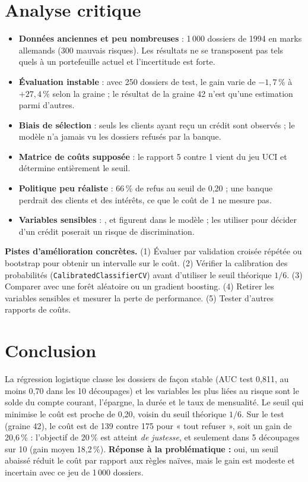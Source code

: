 \documentclass[10.5pt,a4paper]{article}
\newcommand{\var}[1]{\texttt{\detokenize{#1}}}
\newcommand{\pc}{\,\%}
\begin{document}
\section{Analyse critique}
\begin{itemize}
\item \textbf{Données anciennes et peu nombreuses} : 1\,000 dossiers de 1994 en marks allemands (300 mauvais risques). Les résultats ne se transposent pas tels quels à un portefeuille actuel et l'incertitude est forte.
\item \textbf{Évaluation instable} : avec 250 dossiers de test, le gain varie de $-1{,}7\pc{}$ à $+27{,}4\pc{}$ selon la graine ; le résultat de la graine 42 n'est qu'une estimation parmi d'autres.
\item \textbf{Biais de sélection} : seuls les clients ayant reçu un crédit sont observés ; le modèle n'a jamais vu les dossiers refusés par la banque.
\item \textbf{Matrice de coûts supposée} : le rapport 5 contre 1 vient du jeu UCI et détermine entièrement le seuil.
\item \textbf{Politique peu réaliste} : 66\pc{} de refus au seuil de 0,20 ; une banque perdrait des clients et des intérêts, ce que le coût de 1 ne mesure pas.
\item \textbf{Variables sensibles} : \var{age}, \var{statut_personnel} et \var{travailleur_etranger} figurent dans le modèle ; les utiliser pour décider d'un crédit poserait un risque de discrimination.
\end{itemize}
\textbf{Pistes d'amélioration concrètes.} (1) Évaluer par validation croisée répétée ou bootstrap pour obtenir un intervalle sur le coût. (2) Vérifier la calibration des probabilités (\texttt{CalibratedClassifierCV}) avant d'utiliser le seuil théorique $1/6$. (3) Comparer avec une forêt aléatoire ou un gradient boosting. (4) Retirer les variables sensibles et mesurer la perte de performance. (5) Tester d'autres rapports de coûts.

\section{Conclusion}
\begin{encadre}
La régression logistique classe les dossiers de façon stable (AUC test 0,811, au moins 0,70 dans les 10 découpages) et les variables les plus liées au risque sont le solde du compte courant, l'épargne, la durée et le taux de mensualité. Le seuil qui minimise le coût est proche de 0,20, voisin du seuil théorique $1/6$. Sur le test (graine 42), le coût est de 139 contre 175 pour « tout refuser », soit un gain de 20,6\pc{} : l'objectif de 20\pc{} est atteint \emph{de justesse}, et seulement dans 5 découpages sur 10 (gain moyen 18,2\pc). \textbf{Réponse à la problématique :} oui, un seuil abaissé réduit le coût par rapport aux règles naïves, mais le gain est modeste et incertain avec ce jeu de 1\,000 dossiers.
\end{encadre}
\end{document}
